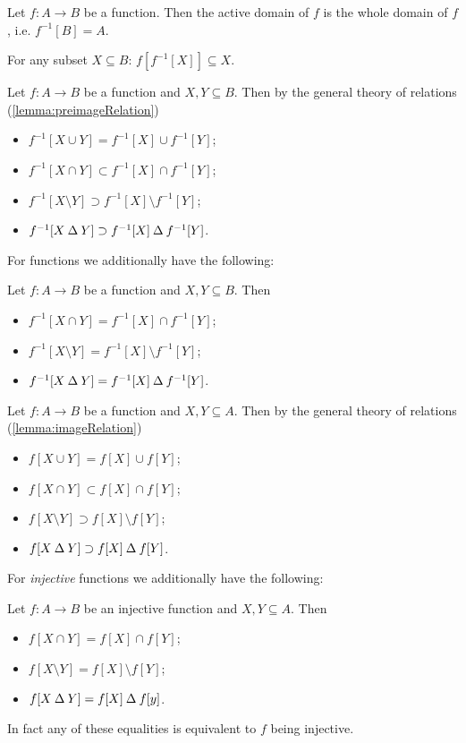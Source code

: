 \begin{lemma}
Let $f:A\to B$ be a function. Then the active domain of $f$ is the whole domain of $f$, i.e. $f^{-1}[B] = A$.
\end{lemma}
For any subset $X\subseteq B$: $f[f^{-1}[X]]\subseteq X$.

Let $f:A\to B$ be a function and $X,Y\subseteq B$. Then by the general theory of relations (\ref{lemma:preimageRelation})
\begin{itemize}
\item $f^{-1}[X\cup Y] = f^{-1}[X]\cup f^{-1}[Y]$;
\item $f^{-1}[X\cap Y] \subset f^{-1}[X]\cap f^{-1}[Y]$;
\item $f^{-1}[X\setminus Y] \supset f^{-1}[X]\setminus f^{-1}[Y]$;
\item $f^{-1}[X\mathbin{\Delta} Y] \supset f^{-1}[X]\mathbin{\Delta} f^{-1}[Y]$.
\end{itemize}
For functions we additionally have the following:
\begin{lemma} \label{lemma:preimageProperties}
Let $f:A\to B$ be a function and $X,Y\subseteq B$. Then
\begin{itemize}
\item $f^{-1}[X\cap Y] = f^{-1}[X]\cap f^{-1}[Y]$;
\item $f^{-1}[X\setminus Y] = f^{-1}[X]\setminus f^{-1}[Y]$;
\item $f^{-1}[X\mathbin{\Delta} Y] = f^{-1}[X]\mathbin{\Delta} f^{-1}[Y]$.
\end{itemize}
\end{lemma}

Let $f:A\to B$ be a function and $X,Y\subseteq A$. Then by the general theory of relations (\ref{lemma:imageRelation})
\begin{itemize}
\item $f[X\cup Y] = f[X]\cup f[Y]$;
\item $f[X\cap Y] \subset f[X]\cap f[Y]$;
\item $f[X\setminus Y] \supset f[X]\setminus f[Y]$;
\item $f[X\mathbin{\Delta} Y] \supset f[X]\mathbin{\Delta} f[Y]$.
\end{itemize}
For \emph{injective} functions we additionally have the following:
\begin{lemma}
Let $f:A\to B$ be an injective function and $X,Y\subseteq A$. Then
\begin{itemize}
\item $f[X\cap Y] = f[X]\cap f[Y]$;
\item $f[X\setminus Y] = f[X]\setminus f[Y]$;
\item $f[X\mathbin{\Delta} Y] = f[X]\mathbin{\Delta} f[y]$.
\end{itemize}
In fact any of these equalities is equivalent to $f$ being injective.
\end{lemma}

